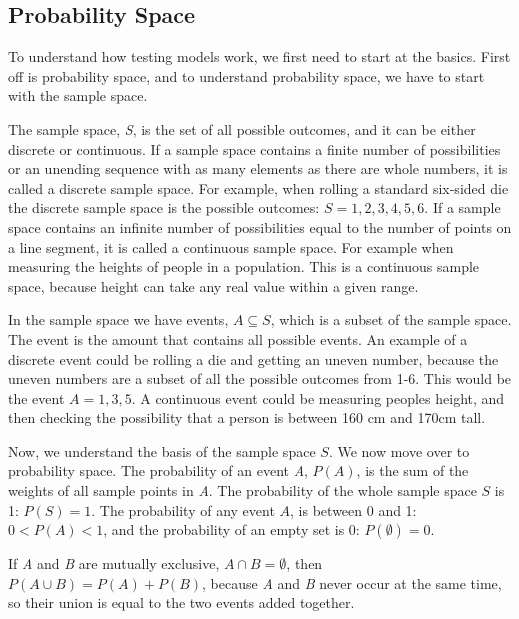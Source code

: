 \subsection{Probability Space}
To understand how testing models work, we first need to start at the basics. First off is probability space, and to understand probability space, we have to start with the sample space. \newline

\noindent The sample space, \textit{S}, is the set of all possible outcomes, and it can be either discrete or continuous. If a sample space contains a finite number of possibilities or an unending sequence with as many elements as there are whole numbers, it is called a discrete sample space. For example, when rolling a standard six-sided die the discrete sample space is the possible outcomes: $S={1,2,3,4,5,6}$. If a sample space contains an infinite number of possibilities equal to the number of points on a line segment, it is called a continuous sample space. For example when measuring the heights of people in a population. This is a continuous sample space, because height can take any real value within a given range.\newline

\noindent In the sample space we have events, $A\subseteq S$, which is a subset of the sample space. The event is the amount that contains all possible events. An example of a discrete event could be rolling a die and getting an uneven number, because the uneven numbers are a subset of all the possible outcomes from 1-6. This would be the event $A={1,3,5}$. A continuous event could be measuring peoples height, and then checking the possibility that a person is between 160 cm and 170cm tall.
\newline

\noindent Now, we understand the basis of the sample space $S$. We now move over to probability space. The probability of an event \textit{A}, $P(A)$, is the sum of the weights of all sample points in \textit{A}.
The probability of the whole sample space $S$ is 1: $P(S)=1$. The probability of any event $A$, is between 0 and 1: $0<P(A)<1$, and the probability of an empty set is 0: $P(\emptyset)=0$.
\newline

\noindent If \textit{A} and \textit{B} are mutually exclusive, $A \cap B = \emptyset$, then $P(A \cup B) = P(A)+P(B)$, because \textit{A} and \textit{B} never occur at the same time, so their union is equal to the two events added together. 
\newline

